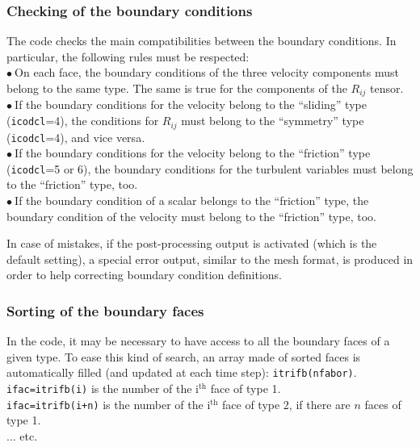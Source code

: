 {{{%
\subsubsection{Checking of the boundary conditions}

The code checks the main compatibilities between the boundary
conditions. In particular, the following rules must be respected: \\
$\bullet\ $On each face, the boundary conditions of the three velocity components must belong to the same type. The same is true for the components of the $R_{ij}$ tensor.\\
$\bullet\ $If the boundary conditions for the velocity belong to the
``sliding'' type (\texttt{icodcl}=4), the conditions for $R_{ij}$ must belong to
the ``symmetry'' type (\texttt{icodcl}=4), and vice versa.\\
$\bullet\ $If the boundary conditions for the velocity belong to the
``friction'' type (\texttt{icodcl}=5 or 6), the boundary conditions for the turbulent variables
must belong to the ``friction'' type, too.\\
$\bullet\ $If the boundary condition of a scalar belongs to the
``friction'' type, the boundary condition of the velocity must belong to
the ``friction'' type, too.

In case of mistakes, if the post-processing output is activated (which is the default setting),
a special error output, similar to the mesh format, is produced in order to help
correcting boundary condition definitions.

\subsubsection{Sorting of the boundary faces}

In the code, it may be necessary to have access to all the boundary
faces of a given type. To ease this kind of search, an array made of
sorted faces is automatically filled (and updated at each time step):
\texttt{itrifb(nfabor)}.\\
\texttt{ifac=itrifb(i)} is the number of the i$^{\text{th}}$  face of type
1.\\
\texttt{ifac=itrifb(i+n)} is the number of the i$^{\text{th}}$ face of type
2, if there are $n$ faces of type 1.\\
... etc.

}}}

